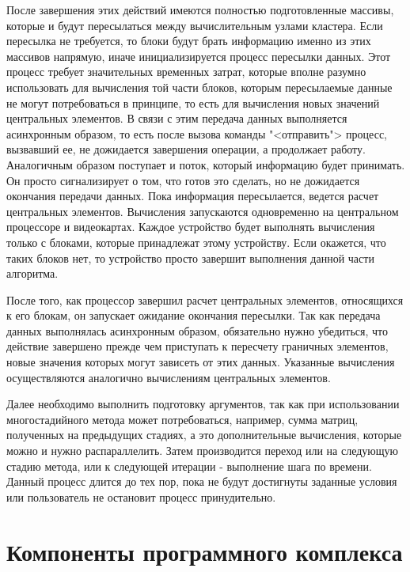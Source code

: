 \documentclass[a4paper, 14pt]{extarticle}
\theoremstyle{definition}
\begin{document}
\par После завершения этих действий имеются полностью подготовленные массивы, которые и будут пересылаться между вычислительным узлами кластера. Если пересылка не требуется, то блоки будут брать информацию именно из этих массивов напрямую, иначе инициализируется процесс пересылки данных. Этот процесс требует значительных временных затрат, которые вполне разумно использовать для вычисления той части блоков, которым пересылаемые данные не могут потребоваться в принципе, то есть для вычисления новых значений центральных элементов. В связи с этим передача данных выполняется асинхронным образом, то есть после вызова команды "<отправить"> процесс, вызвавший ее, не дожидается завершения операции, а продолжает работу. Аналогичным образом поступает и поток, который информацию будет принимать. Он просто сигнализирует о том, что готов это сделать, но не дожидается окончания передачи данных. Пока информация пересылается, ведется расчет центральных элементов. Вычисления запускаются одновременно на центральном процессоре и видеокартах. Каждое устройство будет выполнять вычисления только с блоками, которые принадлежат этому устройству. Если окажется, что таких блоков нет, то устройство просто завершит выполнения данной части алгоритма.

\par После того, как процессор завершил расчет центральных элементов, относящихся к его блокам, он запускает ожидание окончания пересылки. Так как передача данных выполнялась асинхронным образом, обязательно нужно убедиться, что действие завершено прежде чем приступать к пересчету граничных элементов, новые значения которых могут зависеть от этих данных. Указанные вычисления осуществляются аналогично вычислениям центральных элементов.

\par Далее необходимо выполнить подготовку аргументов, так как при использовании многостадийного метода может потребоваться, например, сумма матриц, полученных на предыдущих стадиях, а это дополнительные вычисления, которые можно и нужно распараллелить. Затем  производится переход или на следующую стадию метода, или к следующей итерации - выполнение шага по времени. Данный процесс длится до тех пор, пока не будут достигнуты заданные условия или пользователь не остановит процесс принудительно.

\section{Компоненты программного комплекса}
\end{document}
